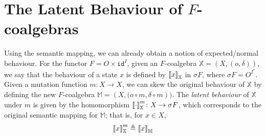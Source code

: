 \section{The Latent Behaviour of $F$-coalgebras}
Using the semantic mapping, we can already obtain a notion of expected/normal behaviour. For the functor $F=O\times \texttt{id}^I$, given an $F$-coalgebra $\mathbb{X}=(X,(o,\delta))$, we say that the behaviour of a state $x$ is defined by ${{\llbracket x\rrbracket}}_{\mathbb{X}}$ in $\sigma F$, where $\sigma F = O^{I^*}$. 
Given a mutation function $m\colon X\rightarrow X$, we can skew the original behaviour of $\mathbb{X}$ by defining the new $F$-coalgebra $\mathbb{M}=(X,{(o\circ m, \delta\circ m }))$. The \emph{latent behaviour} of $\mathbb{X}$ under $m$ is given by the homomorphism ${{\llbracket\cdot\rrbracket}}^{m}_{\mathbb{X}}\colon X\rightarrow \sigma F$, which corresponds to the original semantic mapping for $\mathbb{M}$; that is, for $x\in X$, 
\begin{align}
{{\llbracket x\rrbracket}}^{m}_{\mathbb{X}}\triangleq{{\llbracket x\rrbracket}}_{\mathbb{M}}
\end{align}

